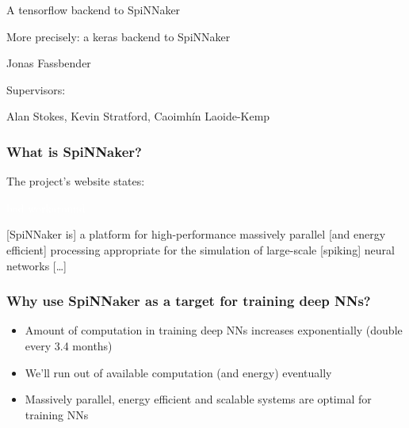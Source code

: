 \documentclass{beamer}
\begin{document}
\begin{frame}
\begin{center}
{\Large A tensorflow backend to SpiNNaker }

More precisely: a keras backend to SpiNNaker

\vspace{2cm}

Jonas Fassbender

\vspace{2cm}

Supervisors:

Alan Stokes, Kevin Stratford, Caoimhín Laoide-Kemp

\end{center}
\end{frame}

\begin{frame}[fragile]
  \frametitle{What is SpiNNaker?}
  \pause

  The project's website \cite{spinnaker_project} states:

  \textcolor{white}{bad workaround}

  [SpiNNaker is] a platform for high-performance massively
  parallel [and energy efficient] processing appropriate
  for the simulation of large-scale [spiking] neural
  networks [\dots]

\end{frame}

\begin{frame}[fragile]
  \frametitle{Why use SpiNNaker as a target for training deep NNs?}
  \pause

  \begin{itemize}[<+->]
    \item Amount of computation in training deep NNs
          increases exponentially (double every 3.4 months)
          \cite{openai2019}
    \item We'll run out of available computation (and
          energy) eventually
    \item Massively parallel, energy efficient and scalable
          systems are optimal for training NNs
  \end{itemize}
\end{frame}
\end{document}
